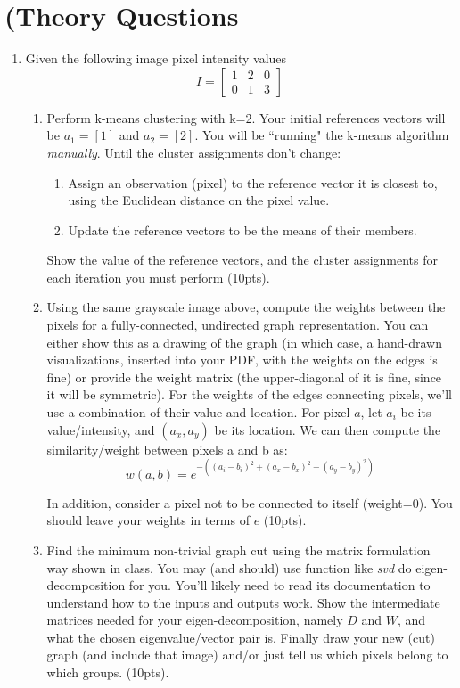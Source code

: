\documentclass[12pt]{article}
\begin{document}
\section{(Theory Questions}
\begin{enumerate}
\item Given the following image pixel intensity values
	$$I=\begin{bmatrix}
	1 & 2 & 0\\
	0 & 1 & 3 
	\end{bmatrix}$$
\begin{enumerate}
\item Perform k-means clustering with k=2.  Your initial references vectors will be $a_1 = [1]$ and $a_2 = [2]$.  You will be ``running" the k-means algorithm \emph{manually}.  Until the cluster assignments don't change:
	\begin{enumerate}
	\item Assign an observation (pixel) to the reference vector it is closest to, using the Euclidean distance on the pixel value.
	\item Update the reference vectors to be the means of their members.
	\end{enumerate}
Show the value of the reference vectors, and the cluster assignments for each iteration you must perform (10pts).

\item Using the same grayscale image above, compute the weights between the pixels for a fully-connected, undirected graph representation.  You can either show this as a drawing of the graph (in which case, a hand-drawn visualizations, inserted into your PDF, with the weights on the edges is fine) or provide the weight matrix (the upper-diagonal of it is fine, since it will be symmetric). For the weights of the edges connecting pixels, we'll use a combination of their value and location.  For pixel $a$, let $a_i$ be its value/intensity, and $(a_x,a_y )$ be its location.  We can then compute the similarity/weight between pixels a and b as:
$$w(a,b)=e^{-((a_i-b_i )^2+(a_x-b_x )^2+(a_y-b_y )^2 ) }$$
	
In addition, consider a pixel not to be connected to itself (weight=0).  You should leave your weights in terms of $e$ (10pts).

\item Find the minimum non-trivial graph cut using the matrix formulation way shown in class.  You may (and should) use function like \emph{svd} do eigen-decomposition for you.  You’ll likely need to read its documentation to understand how to the inputs and outputs work.  Show the intermediate matrices needed for your eigen-decomposition, namely $D$ and $W$, and what the chosen eigenvalue/vector pair is.  Finally draw your new (cut) graph (and include that image) and/or just tell us which pixels belong to which groups. (10pts).
\end{enumerate}
\end{enumerate}
\end{document}
